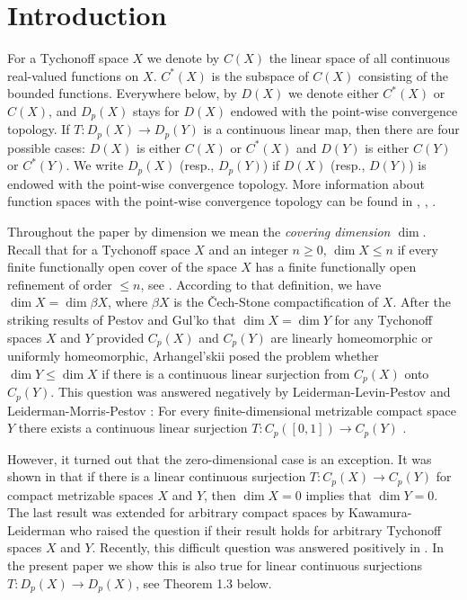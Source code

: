 \documentclass[12pt]{amsart}
\begin{document}



\section{Introduction}\label{intro}
For a Tychonoff space $X$
 we denote by $C(X)$ the linear space of all continuous real-valued functions on $X$.
$C^*(X)$ is the subspace of $C(X)$ consisting of the bounded functions.
Everywhere below, by $D(X)$ we denote either $C^*(X)$ or $C(X)$, and $D_p(X)$ stays for $D(X)$ endowed with the point-wise convergence topology.  
If $T:D_p(X)\to D_p(Y)$ is a continuous linear map, then there are four possible cases: $D(X)$ is either $C(X)$ or $C^*(X)$ and $D(Y)$ is either $C(Y)$ or $C^*(Y)$. We write $D_p(X)$ (resp., $D_p(Y)$) if $D(X)$ (resp., $D(Y)$) is endowed with the point-wise convergence topology.
More information about function spaces with the point-wise convergence topology can be found in 
\cite{ar1}, \cite{vanMill}, \cite{tk}.

Throughout the paper by dimension we mean the {\em covering dimension $\dim$}. 
Recall that for a Tychonoff space $X$ and an integer $n\geq 0$, $\dim X \leq n$ if every finite functionally open cover of the space $X$
 has a finite functionally open refinement of order $\leq n$, see \cite{en}.
According to that definition, we have $\dim X=\dim\beta X$, where $\beta X$ is the \v{C}ech-Stone compactification of $X$.
After the striking results of Pestov \cite{p} and Gul'ko \cite{gu} that $\dim X=\dim Y$ for any Tychonoff spaces $X$ and $Y$ 
provided $C_p(X)$ and $C_p(Y)$ are linearly homeomorphic or uniformly homeomorphic, Arhangel'skii \cite{ar} posed the problem
whether $\dim Y\leq\dim X$ if there is a continuous linear surjection from $C_p(X)$ onto $C_p(Y)$.
This question was answered negatively by Leiderman-Levin-Pestov \cite{llp} and Leiderman-Morris-Pestov \cite{lmp}: 
For every finite-dimensional metrizable compact space $Y$ there exists a continuous linear surjection $T: C_p([0,1])\to C_p(Y)$ \cite{lmp}. 

However, it turned out that the zero-dimensional case is an exception.  It was shown in \cite{llp} that if there is a linear continuous surjection 
$T: C_p(X)\to C_p(Y)$ for compact metrizable spaces $X$ and $Y$,
 then $\dim X=0$ implies that $\dim Y=0$. The last result was extended for arbitrary compact spaces by Kawamura-Leiderman \cite{KawL}
 who raised the question if their result holds for arbitrary Tychonoff spaces $X$ and $Y$.
 Recently, this difficult question was answered positively in \cite{ev}. In the present paper we show this is also true for linear continuous surjections
$T:D_p(X)\to D_p(X)$, see Theorem 1.3 below.  
\end{document}
